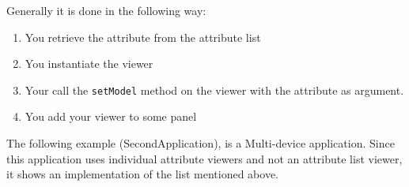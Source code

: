 Generally it is done in the following way:
\begin{enumerate}
\item You retrieve the attribute from the attribute list 
\item You instantiate the viewer 
\item Your call the \texttt{setModel} method on the viewer
with the attribute as argument. 
\item You add your viewer to some panel
\end{enumerate}
The following example (SecondApplication),
is a Multi-device application. Since this application uses individual
attribute viewers and not an attribute list viewer, it shows an implementation
of the list mentioned above.


